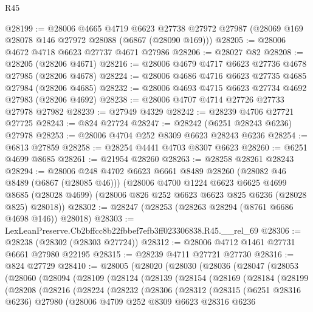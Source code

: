 \begin{lexlean}{R45}
\begin{coremodule}
{@28199 := @28006
    @4665
    @4719
    @6623
    @27738
    @27972
    @27987
    (@28069 @169 @28078 @146 @27972 @28088 (@6867 (@28090 @169)))
@28205 := @28006 @4672 @4718 @6623 @27737 @4671 @27986
@28206 := @28027 @82
@28208 := @28205 (@28206 @4671)
@28216 := @28006 @4679 @4717 @6623 @27736 @4678 @27985 (@28206 @4678)
@28224 := @28006 @4686 @4716 @6623 @27735 @4685 @27984 (@28206 @4685)
@28232 := @28006 @4693 @4715 @6623 @27734 @4692 @27983 (@28206 @4692)
@28238 := @28006 @4707 @4714 @27726 @27733 @27978 @27982
@28239 := @27949 @4329
@28242 := @28239 @4706 @27721 @27725
@28243 := @824 @27724
@28247 := @28242 (@6251 @28243 @6236) @27978
@28253 := @28006 @4704 @252 @8309 @6623 @28243 @6236
@28254 := @6813 @27859
@28258 := @28254 @4441 @4703 @8307 @6623
@28260 := @6251 @4699 @8685
@28261 := @21954 @28260
@28263 := @28258 @28261 @28243
@28294 := @28006
    @248
    @4702
    @6623
    @6661
    @8489
    @28260
    (@28082 @46 @8489 (@6867 (@28085 @46)))
    (@28006
      @4700
      @1224
      @6623
      @6625
      @4699
      @8685
      (@28028 @4699)
      (@28006 @826 @252 @6623 @6623 @825 @6236 (@28028 @825) @28018))
@28302 := @28247 (@28253 (@28263 @28294 (@8761 @6686 @4698 @146)) @28018)
@28303 := LexLeanPreserve.Cb2bffcc8b22fbbef7efb3ff023306838.R45.__rel_69
@28306 := @28238 (@28302 (@28303 @27724))
@28312 := @28006 @4712 @1461 @27731 @6661 @27980 @22195
@28315 := @28239 @4711 @27721 @27730
@28316 := @824 @27729
@28410 := @28005
    (@28020
      (@28030
        (@28036
          (@28047
            (@28053
              (@28060
                (@28094
                  (@28109
                    (@28124
                      (@28139
                        (@28154
                          (@28169
                            (@28184
                              (@28199
                                (@28208
                                  (@28216
                                    (@28224
                                      (@28232
                                        (@28306
                                          (@28312
                                            (@28315
                                              (@6251 @28316 @6236)
                                              @27980
                                              (@28006
                                                @4709
                                                @252
                                                @8309
                                                @6623
                                                @28316
                                                @6236
}
\end{coremodule}
\end{lexlean}
